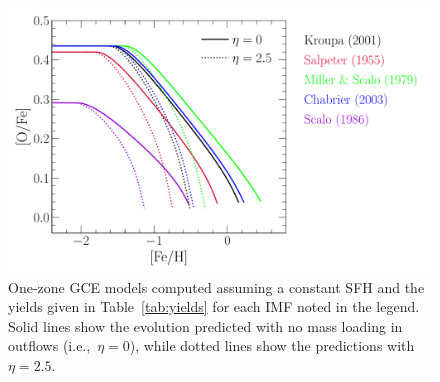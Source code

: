 \documentclass[12pt]{article}
\begin{document}
\begin{figure}
\centering
\includegraphics[scale = 0.6]{onezone_different_imfs.pdf}
\caption{
One-zone GCE models computed assuming a constant SFH and the yields given in
Table~\ref{tab:yields} for each IMF noted in the legend.
Solid lines show the evolution predicted with no mass loading in outflows
(i.e.,~$\eta = 0$), while dotted lines show the predictions with~$\eta = 2.5$.
}
\label{fig:onezone}
\end{figure}
\end{document}
